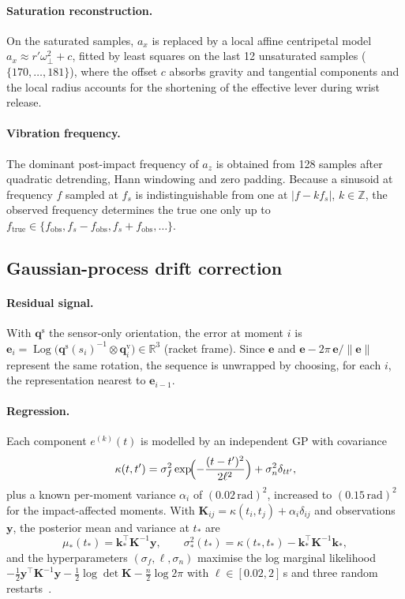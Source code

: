 \documentclass[11pt,a4paper]{article}
\newcommand{\q}{\bm{q}}
\newcommand{\ve}[1]{\bm{#1}}
\newcommand{\qmul}{\otimes}
\newcommand{\Log}{\operatorname{Log}}
\newcommand{\norm}[1]{\left\lVert #1 \right\rVert}
\begin{document}
\paragraph{Saturation reconstruction.} On the saturated samples, $a_x$ is replaced by a local
affine centripetal model $a_x\approx r'\omega_\perp^2+c$, fitted by least squares on the last 12
unsaturated samples ($\{170,\ldots,181\}$), where the offset $c$ absorbs gravity and tangential
components and the local radius accounts for the shortening of the effective lever during wrist
release.

\paragraph{Vibration frequency.} The dominant post-impact frequency of $a_z$ is obtained from 128
samples after quadratic detrending, Hann windowing and zero padding. Because a sinusoid at
frequency $f$ sampled at $f_s$ is indistinguishable from one at $|f-kf_s|$, $k\in\mathbb Z$, the
observed frequency determines the true one only up to $f_{\mathrm{true}}\in\{f_{\mathrm{obs}},
f_s-f_{\mathrm{obs}},f_s+f_{\mathrm{obs}},\ldots\}$.

\subsection{Gaussian-process drift correction}\label{sec:gp}
\paragraph{Residual signal.} With $\q^{\mathrm s}$ the sensor-only orientation, the error at moment
$i$ is $\ve e_i=\Log\bigl(\q^{\mathrm s}(s_i)^{-1}\qmul\q^{\mathrm v}_i\bigr)\in\mathbb R^3$
(racket frame). Since $\ve e$ and $\ve e-2\pi\,\ve e/\norm{\ve e}$ represent the same rotation, the
sequence is unwrapped by choosing, for each $i$, the representation nearest to $\ve e_{i-1}$.

\paragraph{Regression.} Each component $e^{(k)}(t)$ is modelled by an independent GP with
covariance
\begin{equation}
\kappa(t,t')=\sigma_f^2\exp\!\Bigl(-\frac{(t-t')^2}{2\ell^2}\Bigr)+\sigma_n^2\delta_{tt'},
\end{equation}
plus a known per-moment variance $\alpha_i$ of $(0.02\,\mathrm{rad})^2$, increased to
$(0.15\,\mathrm{rad})^2$ for the impact-affected moments. With
$\mathbf K_{ij}=\kappa(t_i,t_j)+\alpha_i\delta_{ij}$ and observations $\ve y$, the posterior mean and
variance at $t_*$ are~\cite{rasmussen2006}
\begin{equation}
\mu_*(t_*)=\ve k_*^{\top}\mathbf K^{-1}\ve y,\qquad
\sigma_*^2(t_*)=\kappa(t_*,t_*)-\ve k_*^{\top}\mathbf K^{-1}\ve k_*,
\end{equation}
and the hyperparameters $(\sigma_f,\ell,\sigma_n)$ maximise the log marginal likelihood
$-\tfrac12\ve y^{\top}\mathbf K^{-1}\ve y-\tfrac12\log\det\mathbf K-\tfrac{n}{2}\log2\pi$ with
$\ell\in[0.02,2]$\,s and three random restarts~\cite{sklearn2011}.
\end{document}
